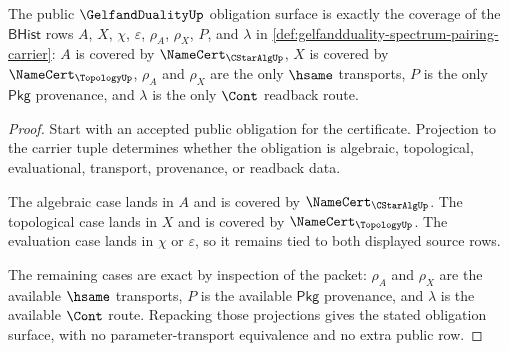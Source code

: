 \begin{theorem}
\label{thm:gelfandduality-namecert-obligation-surface}
The public $\GelfandDualityUp$ obligation surface is exactly the coverage of
the $\mathsf{BHist}$ rows $A$, $X$, $\chi$, $\varepsilon$, $\rho_{A}$,
$\rho_{X}$, $P$, and $\lambda$ in
\autoref{def:gelfandduality-spectrum-pairing-carrier}: $A$ is covered by
$\NameCert_{\CStarAlgUp}$, $X$ is covered by $\NameCert_{\TopologyUp}$,
$\rho_{A}$ and $\rho_{X}$ are the only $\hsame$ transports, $P$ is the only
$\mathsf{Pkg}$ provenance, and $\lambda$ is the only $\Cont$ readback route.
\end{theorem}
\begin{proof}
Start with an accepted public obligation for the certificate. Projection to
the carrier tuple determines whether the obligation is algebraic,
topological, evaluational, transport, provenance, or readback data.

The algebraic case lands in $A$ and is covered by
$\NameCert_{\CStarAlgUp}$. The topological case lands in $X$ and is covered
by $\NameCert_{\TopologyUp}$. The evaluation case lands in $\chi$ or
$\varepsilon$, so it remains tied to both displayed source rows.

The remaining cases are exact by inspection of the packet: $\rho_{A}$ and
$\rho_{X}$ are the available $\hsame$ transports, $P$ is the available
$\mathsf{Pkg}$ provenance, and $\lambda$ is the available $\Cont$ route.
Repacking those projections gives the stated obligation surface, with no
parameter-transport equivalence and no extra public row.
\end{proof}

